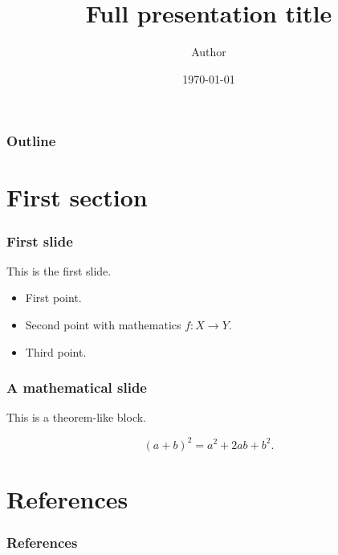 \documentclass[12pt]{beamer}
\title[Short title]{Full presentation title}
\author{Author}
\institute{Institution}
\date{\today}
\begin{document}
\frame{\titlepage}

\begin{frame}
\frametitle{Outline}
\tableofcontents
\end{frame}

\section{First section}

\begin{frame}
\frametitle{First slide}

This is the first slide.

\begin{itemize}
  \item First point.
  \item Second point with mathematics \(f \colon X \to Y\).
  \item Third point.
\end{itemize}
\end{frame}

\begin{frame}
\frametitle{A mathematical slide}

\begin{theorem}
This is a theorem-like block.
\end{theorem}

\[
  (a+b)^2 = a^2 + 2ab + b^2.
\]
\end{frame}

\section{References}

\begin{frame}[allowframebreaks]
\frametitle{References}
\printbibliography
\end{frame}
\end{document}
